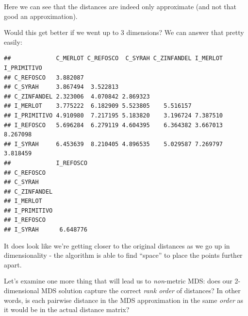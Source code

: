 \documentclass[
]{book}
\newenvironment{Shaded}{\begin{snugshade}}{\end{snugshade}}
\newcommand{\AttributeTok}[1]{\textcolor[rgb]{0.13,0.29,0.53}{#1}}
\newcommand{\ConstantTok}[1]{\textcolor[rgb]{0.56,0.35,0.01}{#1}}
\newcommand{\DecValTok}[1]{\textcolor[rgb]{0.00,0.00,0.81}{#1}}
\newcommand{\FunctionTok}[1]{\textcolor[rgb]{0.13,0.29,0.53}{\textbf{#1}}}
\newcommand{\NormalTok}[1]{#1}
\newcommand{\SpecialCharTok}[1]{\textcolor[rgb]{0.81,0.36,0.00}{\textbf{#1}}}
\begin{document}
Here we can see that the distances are indeed only approximate (and not that good an approximation).

Would this get better if we went up to 3 dimensions? We can answer that pretty easily:

\begin{Shaded}
\end{Shaded}

\begin{verbatim}
##             C_MERLOT C_REFOSCO  C_SYRAH C_ZINFANDEL I_MERLOT I_PRIMITIVO
## C_REFOSCO   3.882087                                                    
## C_SYRAH     3.867494  3.522813                                          
## C_ZINFANDEL 2.323006  4.070842 2.869323                                 
## I_MERLOT    3.775222  6.182909 5.523805    5.516157                     
## I_PRIMITIVO 4.910980  7.217195 5.183820    3.196724 7.387510            
## I_REFOSCO   5.696284  6.279119 4.604395    6.364382 3.667013    8.267098
## I_SYRAH     6.453639  8.210405 4.896535    5.029587 7.269797    3.818459
##             I_REFOSCO
## C_REFOSCO            
## C_SYRAH              
## C_ZINFANDEL          
## I_MERLOT             
## I_PRIMITIVO          
## I_REFOSCO            
## I_SYRAH      6.648776
\end{verbatim}

It does look like we're getting closer to the original distances as we go up in dimensionality - the algorithm is able to find ``space'' to place the points further apart.

Let's examine one more thing that will lead us to \emph{non}-metric MDS: does our 2-dimensional MDS solution capture the correct \emph{rank order} of distances? In other words, is each pairwise distance in the MDS approximation in the same \emph{order} as it would be in the actual distance matrix?
\end{document}
